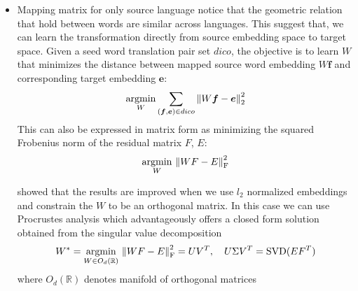 \begin{itemize}
	\item Mapping matrix for only source language
	\cite{mikolov2013exploiting} notice that the geometric relation that hold between words are similar across languages. This suggest that, we can learn the transformation directly from source embedding space to target space.
	Given a seed word translation pair set $dico$, the objective is to learn $W$ that minimizes the distance between mapped source word embedding $W\bm{f}$ and corresponding target embedding $\bm{e}$:
	\[ \underset{W}{\operatorname{argmin}} \sum_{(\bm{f}, \bm{e}) \in dico}  {\lVert W\bm{f} - \bm{e} \rVert}_2^2 \]
	This can also be expressed in matrix form as minimizing the squared Frobenius norm of the residual matrix $F$, $E$:
	\[ \underset{W}{\operatorname{argmin}} {\ \lVert WF - E \rVert}_{\text{F}}^2 \]
	
	
	
	\cite{xing2015normalized} showed that the results are improved when we use $l_2$ normalized embeddings and constrain the ${W}$ to be an orthogonal matrix. In this case we can use Procrustes analysis which advantageously offers a closed form solution obtained from the singular value decomposition 
	\[W^* = \underset{W \in O_d(\mathbb{R})}{\operatorname{argmin}} {\ \lVert WF - E \rVert}_{\text{F}}^2 = UV^T , \quad U\Sigma V^T = \text{SVD}(EF^T) \]
	where $ O_d(\mathbb{R})$ denotes manifold of orthogonal matrices 
\end{itemize}


\[ \]





